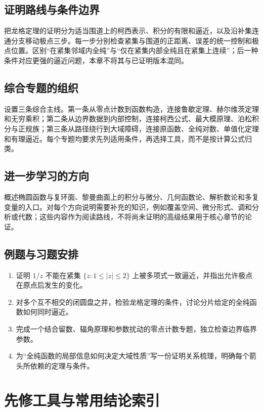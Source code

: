 \documentclass[UTF8,12pt,a4paper,fontset=fandol]{ctexbook}
\begin{document}
\section{证明路线与条件边界}
把龙格定理的证明分为适当围道上的柯西表示、积分的有限和逼近，以及沿补集连通分支移动极点三步。每一步分别检查紧集与围道的正距离、误差的统一控制和极点位置。区别“在紧集邻域内全纯”与“仅在紧集内部全纯且在紧集上连续”；后一种条件对应更强的逼近问题，本章不将其与已证明版本混同。

\section{综合专题的组织}
设置三条综合主线。第一条从零点计数到函数构造，连接鲁歇定理、赫尔维茨定理和无穷乘积；第二条从边界数据到内部控制，连接柯西公式、最大模原理、泊松积分与正规族；第三条从路径绕行到大域障碍，连接原函数、全纯对数、单值化定理和有理逼近。每个专题均要求先列适用条件，再选择工具，而不是按计算公式归类。

\section{进一步学习的方向}
概述椭圆函数与复环面、黎曼曲面上的积分与微分、几何函数论、解析数论和多复变量的入口。对每个方向说明需要补充的知识，例如覆盖空间、微分形式、调和分析或代数；这些内容作为阅读路线，不将尚未证明的高级结果用于核心章节的论证。

\section{例题与习题安排}
\begin{enumerate}
  \item 证明 $1/z$ 不能在紧集 $\{z:1\le|z|\le2\}$ 上被多项式一致逼近，并指出允许极点在原点后发生的变化。
  \item 对多个互不相交的闭圆盘之并，检验龙格定理的条件，讨论分片给定的全纯函数如何同时逼近。
  \item 完成一个结合留数、辐角原理和参数扰动的零点计数专题，独立检查边界临界参数。
  \item 为“全纯函数的局部信息如何决定大域性质”写一份证明关系梳理，明确每个箭头所依赖的定理与条件。
\end{enumerate}


\appendix

\chapter{先修工具与常用结论索引}
\label{chap:ca-prerequisites}
\end{document}

